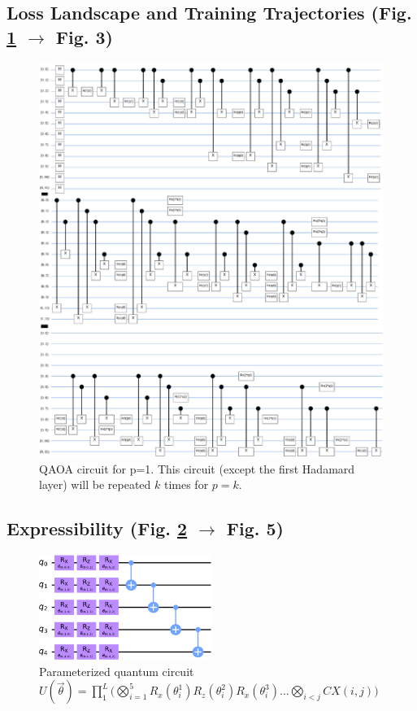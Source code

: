 \documentclass[%
 reprint,
 amsmath,
 amssymb,
 showkeys,
 pra,
 floatfix,
 onecolumn,
]{revtex4-2}
\begin{document}
\subsection{Loss Landscape and Training Trajectories (Fig. \ref{fig:qaoa-circuit} $\rightarrow$ Fig. 3)}
\begin{figure}[!ht]
    \centering
    \includegraphics[width=\textwidth]{images/qaoa-circuit.pdf}
    \caption{QAOA circuit for p=1. This circuit (except the first Hadamard layer) will be repeated $k$ times for $p=k$.}
    \label{fig:qaoa-circuit}
\end{figure}

\subsection{Expressibility (Fig. \ref{fig:expr-circuit} $\rightarrow$ Fig. 5)}
\begin{figure}[!ht]
    \centering
    \includegraphics[width=0.5\textwidth]{images/expr_circuit.pdf}
    \caption{Parameterized quantum circuit $U(\vec{\theta}) =  \prod_{1}^{L}\big(\bigotimes_{i=1}^{5}R_x(\theta_i^1)R_z(\theta_i^2)R_x(\theta_i^3) \ldots \bigotimes_{i<j}CX(i, j)\big)$}
    \label{fig:expr-circuit}
\end{figure}
\end{document}
